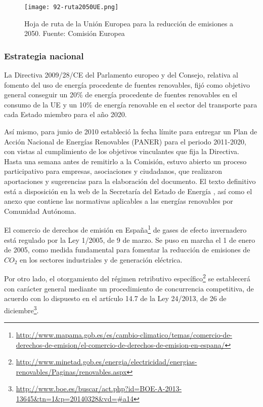 \begin{figure}
\centering
\texttt{[image: 92-ruta2050UE.png]}
\caption[Hoja de ruta UE]{Hoja de ruta de la Unión Europea para la reducción de emisiones a 2050. Fuente: Comisión Europea}
\label{fig:rutaUE}
\end{figure}

\subsubsection{Estrategia nacional}\label{header-n130}

La Directiva 2009/28/CE del Parlamento europeo y del Consejo, relativa
al fomento del uso de energía procedente de fuentes renovables, fijó
como objetivo general conseguir un 20\% de energía procedente de fuentes
renovables en el consumo de la UE y un 10\% de energía renovable en el
sector del transporte para cada Estado miembro para el año 2020.

Así mismo, para junio de 2010 estableció la fecha límite para entregar
un Plan de Acción Nacional de Energías Renovables (PANER) \cite{paner} para el
periodo 2011-2020, con vistas al cumplimiento de los objetivos
vinculantes que fija la Directiva. Hasta una semana antes de remitirlo a
la Comisión, estuvo abierto un proceso participativo para empresas,
asociaciones y ciudadanos, que realizaron aportaciones y sugerencias
para la elaboración del documento. El texto definitivo está a
disposición en la web de la Secretaría del Estado de Energía
, así como el anexo que contiene las normativas aplicables a
las energías renovables por Comunidad Autónoma.

El
comercio de derechos de emisión en España\footnote{\url{http://www.mapama.gob.es/es/cambio-climatico/temas/comercio-de-derechos-de-emision/el-comercio-de-derechos-de-emision-en-espana/}} de gases de efecto
invernadero está regulado por la Ley 1/2005, de 9 de marzo. Se puso en
marcha el 1 de enero de 2005, como medida fundamental para fomentar la
reducción de emisiones de \(CO_2\) en los sectores industriales y de
generación eléctrica.

Por otro lado, el otorgamiento del régimen
retributivo específico\footnote{\url{http://www.minetad.gob.es/energia/electricidad/energias-renovables/Paginas/renovables.aspx}} se establecerá con carácter general mediante un
procedimiento de concurrencia competitiva, de acuerdo con lo dispuesto
en el artículo
14.7 de la Ley 24/2013, de 26 de diciembre\footnote{\url{http://www.boe.es/buscar/act.php?id=BOE-A-2013-13645\&tn=1\&p=20140328\&vd=\#a14}}.

